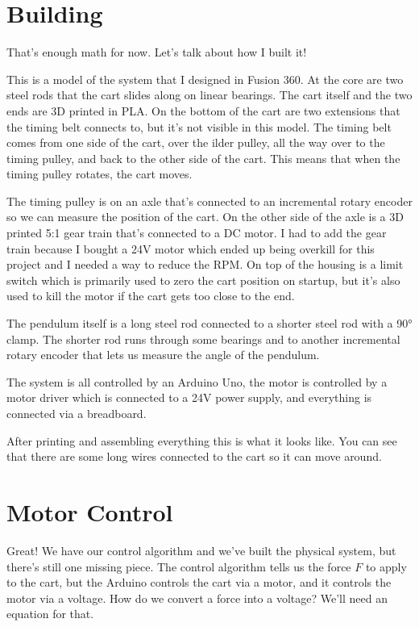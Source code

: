 \documentclass{article}
\begin{document}
\section{Building}

That's enough math for now. Let's talk about how I built it!

This is a model of the system that I designed in Fusion 360. At the core are two steel rods that the cart slides along on linear bearings. The cart itself and the two ends are 3D printed in PLA. On the bottom of the cart are two extensions that the timing belt connects to, but it's not visible in this model. The timing belt comes from one side of the cart, over the ilder pulley, all the way over to the timing pulley, and back to the other side of the cart. This means that when the timing pulley rotates, the cart moves.

The timing pulley is on an axle that's connected to an incremental rotary encoder so we can measure the position of the cart. On the other side of the axle is a 3D printed 5:1 gear train that's connected to a DC motor. I had to add the gear train because I bought a 24V motor which ended up being overkill for this project and I needed a way to reduce the RPM. On top of the housing is a limit switch which is primarily used to zero the cart position on startup, but it's also used to kill the motor if the cart gets too close to the end.

The pendulum itself is a long steel rod connected to a shorter steel rod with a 90° clamp. The shorter rod runs through some bearings and to another incremental rotary encoder that lets us measure the angle of the pendulum.

The system is all controlled by an Arduino Uno, the motor is controlled by a motor driver which is connected to a 24V power supply, and everything is connected via a breadboard.

After printing and assembling everything this is what it looks like. You can see that there are some long wires connected to the cart so it can move around.

\section{Motor Control}

Great! We have our control algorithm and we've built the physical system, but there's still one missing piece. The control algorithm tells us the force $F$ to apply to the cart, but the Arduino controls the cart via a motor, and it controls the motor via a voltage. How do we convert a force into a voltage? We'll need an equation for that.
\end{document}
